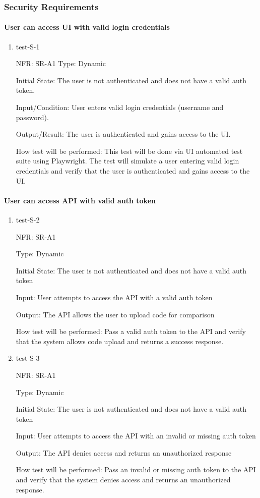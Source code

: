 \documentclass[12pt, titlepage]{article}
\begin{document}
\subsubsection{Security Requirements}

\paragraph{User can access UI with valid login credentials}
\begin{enumerate}
  \item{test-S-1}

  NFR: SR-A1
  Type: Dynamic
            
  Initial State: The user is not authenticated and does not have a valid auth token.
            
  Input/Condition: User enters valid login credentials (username and password).
            
  Output/Result: The user is authenticated and gains access to the UI.
            
  How test will be performed: 
  This test will be done via UI automated test suite using Playwright. The test will simulate a user entering valid login 
  credentials and verify that the user is authenticated and gains access to the UI.
\end{enumerate}
\paragraph{User can access API with valid auth token}
\begin{enumerate}
  \item{test-S-2}

  NFR: SR-A1

  Type: Dynamic
            
  Initial State: The user is not authenticated and does not have a valid auth token
            
  Input: User attempts to access the API with a valid auth token
            
  Output: The API allows the user to upload code for comparison
            
  How test will be performed: 
  Pass a valid auth token to the API and verify that the system allows code upload and returns a success response.

  \item{test-S-3}

  NFR: SR-A1

  Type: Dynamic

  Initial State: The user is not authenticated and does not have a valid auth token

  Input: User attempts to access the API with an invalid or missing auth token

  Output: The API denies access and returns an unauthorized response

  How test will be performed:
  Pass an invalid or missing auth token to the API and verify that the system denies access and returns an unauthorized response.

\end{enumerate}
\end{document}

